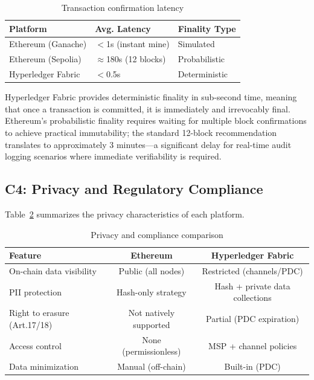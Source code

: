 \documentclass[12pt,a4paper]{article}
\begin{document}
\begin{table}[H]
\centering
\caption{Transaction confirmation latency}
\label{tab:latency}
\begin{tabular}{@{}lll@{}}
\toprule
\textbf{Platform} & \textbf{Avg. Latency} & \textbf{Finality Type} \\
\midrule
Ethereum (Ganache)    & $<$1s (instant mine)  & Simulated \\
Ethereum (Sepolia)    & $\approx$180s (12 blocks) & Probabilistic \\
Hyperledger Fabric    & $<$0.5s               & Deterministic \\
\bottomrule
\end{tabular}
\end{table}

Hyperledger Fabric provides deterministic finality in sub-second time, meaning that once a transaction is committed, it is immediately and irrevocably final. Ethereum's probabilistic finality requires waiting for multiple block confirmations to achieve practical immutability; the standard 12-block recommendation translates to approximately 3 minutes---a significant delay for real-time audit logging scenarios where immediate verifiability is required.

\subsection{C4: Privacy and Regulatory Compliance}

Table~\ref{tab:privacy} summarizes the privacy characteristics of each platform.

\begin{table}[H]
\centering
\caption{Privacy and compliance comparison}
\label{tab:privacy}
\begin{tabular}{@{}lcc@{}}
\toprule
\textbf{Feature} & \textbf{Ethereum} & \textbf{Hyperledger Fabric} \\
\midrule
On-chain data visibility   & Public (all nodes) & Restricted (channels/PDC) \\
PII protection              & Hash-only strategy & Hash + private data collections \\
Right to erasure (Art.17/18) & Not natively supported & Partial (PDC expiration) \\
Access control               & None (permissionless) & MSP + channel policies \\
Data minimization            & Manual (off-chain)    & Built-in (PDC) \\
\bottomrule
\end{tabular}
\end{table}
\end{document}
